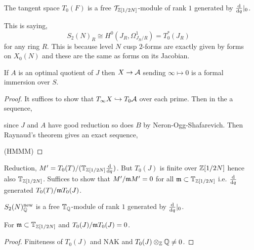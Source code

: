 \documentclass[12pt]{article}
\begin{document}
\begin{theorem}
The tangent space $T_0(F)$ is a free $\mathcal{T}_{\mathbb{Z}[1/2N]}$-module of rank $1$ generated by $\frac{\mathrm{d}{}}{\mathrm{d}{q}} |_0$. 
\end{theorem}

\begin{rmk}
This is saying,
\[ S_2(N)_R \cong H^0(J_R, \Omega^1_{J_R/R}) = T^*_0(J_R) \]
for any ring $R$. This is because level $N$ cusp $2$-forms are exactly given by forms on $X_0(N)$ and these are the same as forms on its Jacobian. 
\end{rmk}

\begin{cor}
If $A$ is an optimal quotient of $J$ then $X \to \mathcal{A}$ sending $\infty \mapsto 0$ is a formal immersion over $S$.
\end{cor}

\begin{proof}
It suffices to show that $T_\infty X \hookrightarrow T_0 \mathcal{A}$ over each prime. Then in the a sequence,
\begin{center}
\end{center}
since $J$ and $A$ have good reduction so does $B$ by Neron-Ogg-Shafarevich. Then Raynaud's theorem gives an exact sequence,
\begin{center}
\end{center} 
(HMMM)
\end{proof}

Reduction, $M' = T_0(T) / (\mathbb{T}_{\mathbb{Z}[1/2N]} \frac{\mathrm{d}{}}{\mathrm{d}{q}})$. But $T_0(J)$ is finite over $\mathbb{Z}[1/2N]$ hence also $\mathbb{T}_{\mathbb{Z}[1/2N]}$. Suffices to show that $M' / \mathfrak{m} M' = 0$ for all $\mathfrak{m} \subset \mathbb{T}_{\mathbb{Z}[1/2N]}$ i.e. $\frac{\mathrm{d}{}}{\mathrm{d}{q}}$ generated $T_0(T) / \mathfrak{m} T_0(J)$. 

\begin{lemma}
$S_2(N)_{\mathbb{Q}}^{\text{new}}$ is a free $\mathbb{T}_{\mathbb{Q}}$-module of rank  $1$ generated by $\frac{\mathrm{d}{}}{\mathrm{d}{q}}|_0$.
\end{lemma}

\begin{lemma}
For $\mathfrak{m} \subset \mathbb{T}_{\mathbb{Z}[1/2N]}$ and $T_0(J) / \mathfrak{m} T_0(J) = 0$. 
\end{lemma}

\begin{proof}
Finiteness of $T_0(J)$ and NAK and $T_0(J) \otimes_{\mathbb{Z}} \mathbb{Q} \neq 0$.
\end{proof}
\end{document}

